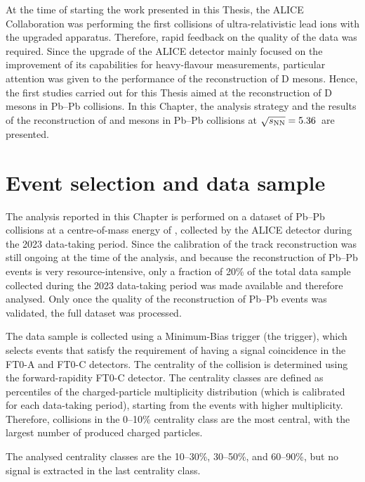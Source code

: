 At the time of starting the work presented in this Thesis, the ALICE Collaboration was performing the first collisions of ultra-relativistic lead ions with the upgraded apparatus. Therefore, rapid feedback on the quality of the data was required. Since the upgrade of the ALICE detector mainly focused on the improvement of its capabilities for heavy-flavour measurements, particular attention was given to the performance of the reconstruction of D mesons. Hence, the first studies carried out for this Thesis aimed at the reconstruction of D mesons in Pb--Pb collisions. In this Chapter, the analysis strategy and the results of the reconstruction of \ds and \dpl mesons in Pb--Pb collisions at $\sqrt{s_\mathrm{NN}}=5.36$~\tev are presented.

\section{Event selection and data sample}
The analysis reported in this Chapter is performed on a dataset of Pb--Pb collisions at a centre-of-mass energy of \fivenn, collected by the ALICE detector during the 2023 data-taking period. Since the calibration of the track reconstruction was still ongoing at the time of the analysis, and because the reconstruction of Pb--Pb events is very resource-intensive, only a fraction of 20\% of the total data sample collected during the 2023 data-taking period was made available and therefore analysed. Only once the quality of the reconstruction of Pb--Pb events was validated, the full dataset was processed.

The data sample is collected using a Minimum-Bias trigger (the  trigger), which selects events that satisfy the requirement of having a signal coincidence in the FT0-A and FT0-C detectors. The centrality of the collision is determined using the forward-rapidity FT0-C detector. The centrality classes are defined as percentiles of the charged-particle multiplicity distribution (which is calibrated for each data-taking period), starting from the events with higher multiplicity. Therefore, collisions in the 0--10\% centrality class are the most central, with the largest number of produced charged particles.

The analysed centrality classes are the 10--30\%, 30--50\%, and 60--90\%, but no signal is extracted in the last centrality class. 


